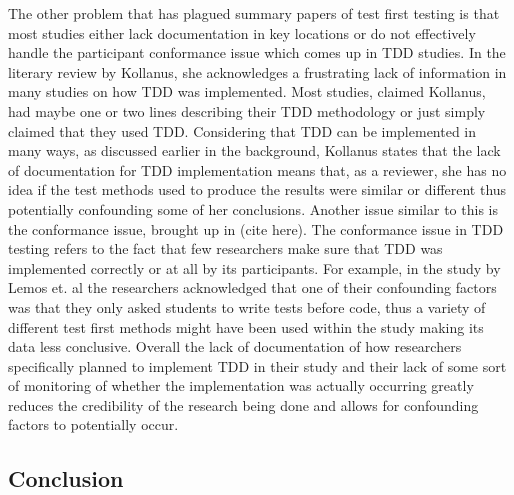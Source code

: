 \documentclass{sig-alternate}
\begin{document}
The other problem that has plagued summary papers of test first testing is that most studies either lack documentation in key locations or do not effectively handle the participant conformance issue which comes up in TDD studies.  In the literary review by Kollanus, she acknowledges a frustrating lack of information in many studies on how TDD was implemented.  Most studies, claimed Kollanus, had maybe one or two lines describing their TDD methodology or just simply claimed that they used TDD.  Considering that TDD can be implemented in many ways, as discussed earlier in the background, Kollanus states that the lack of documentation for TDD implementation means that, as a reviewer, she has no idea if the test methods used to produce the results were similar or different thus potentially confounding some of her conclusions.  Another issue similar to this is the conformance issue, brought up in (cite here).  The conformance issue in TDD testing refers to the fact that few researchers make sure that TDD was implemented correctly or at all by its participants.  For example, in the study by Lemos et. al the researchers acknowledged that one of their confounding factors was that they only asked students to write tests before code, thus a variety of different test first methods might have been used within the study making its data less conclusive.   Overall the lack of documentation of how researchers specifically planned to implement TDD in their study and their lack of some sort of monitoring of whether the implementation was actually occurring greatly reduces the credibility of the research being done and allows for confounding factors to potentially occur. 

\subsection{Conclusion}
\end{document}
